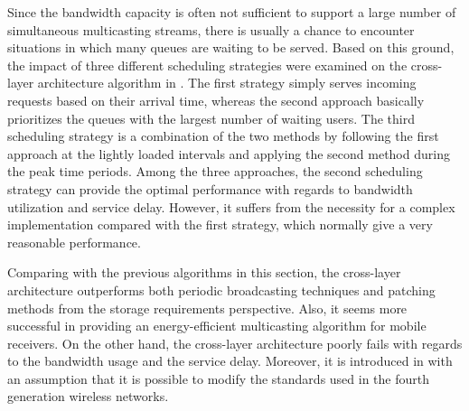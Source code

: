 Since the bandwidth capacity is often not sufficient to support a large number of simultaneous multicasting streams, there is usually a chance to encounter situations in which many queues are waiting to be served. Based on this ground, the impact of three different scheduling strategies were examined on the cross-layer architecture algorithm in \cite{ref22}. The first strategy simply serves incoming requests based on their arrival time, whereas the second approach basically prioritizes the queues with the largest number of waiting users. The third scheduling strategy is a combination of the two methods by following the first approach at the lightly loaded intervals and applying the second method during the peak time periods. Among the three approaches, the second scheduling strategy can provide the optimal performance with regards to bandwidth utilization and service delay. However, it suffers from the necessity for a complex implementation compared with the first strategy, which normally give a very reasonable performance.

Comparing with the previous algorithms in this section, the cross-layer architecture outperforms both periodic broadcasting techniques and patching methods from the storage requirements perspective. Also, it seems more successful in providing an energy-efficient multicasting algorithm for mobile receivers. On the other hand, the cross-layer architecture poorly fails with regards to the bandwidth usage and the service delay. Moreover, it is introduced in \cite{ref22} with an assumption that it is possible to modify the standards used in the fourth generation wireless networks.